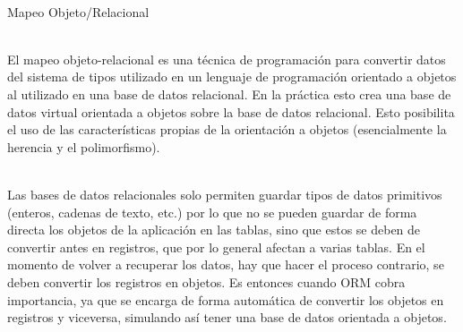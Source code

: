 \begin{flushleft}
\begin{itemize}
\textbf{}\\
Mapeo Objeto/Relacional

\textbf{}\\
El  mapeo  objeto-relacional  es  una  técnica  de  programación para  convertir  datos  del  sistema  de  tipos utilizado  en  un  lenguaje  de  programación  orientado  a  objetos  al  utilizado  en  una  base  de  datos relacional. En la práctica esto crea una base de datos virtual orientada a objetos sobre la base de datos relacional. Esto posibilita el uso de las características propias de la orientación a objetos (esencialmente la herencia y el polimorfismo).

\textbf{}\\
Las  bases  de  datos  relacionales  solo  permiten  guardar  tipos  de  datos  primitivos  (enteros,  cadenas  de texto, etc.) por lo que no se pueden guardar de forma directa los objetos de la aplicación en las tablas, sino que estos se deben de convertir antes en registros, que por lo general afectan a varias tablas. En el momento  de  volver  a  recuperar  los  datos,  hay  que  hacer  el  proceso  contrario,  se  deben  convertir  los registros  en  objetos.  Es  entonces  cuando  ORM  cobra  importancia,  ya  que  se  encarga  de  forma automática  de  convertir  los  objetos  en  registros  y  viceversa,  simulando  así  tener  una  base  de  datos orientada a objetos.


\end{itemize}
\end{flushleft}
